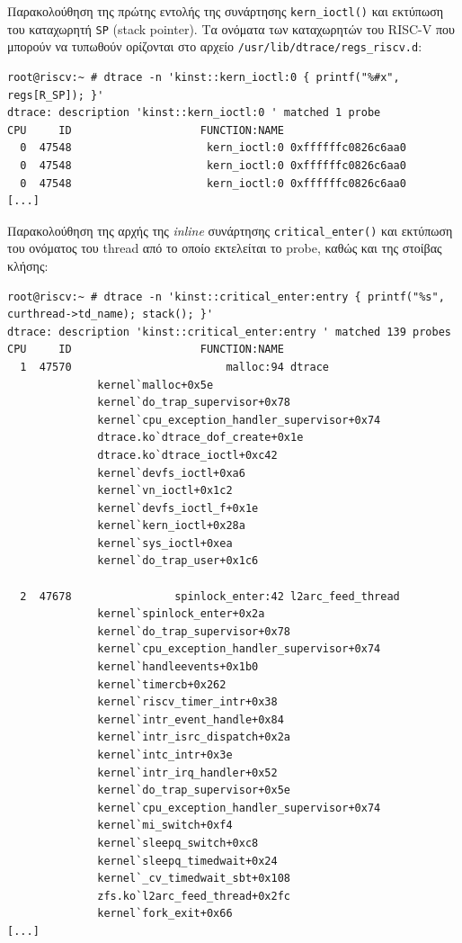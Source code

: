 \documentclass[12pt]{article}
\begin{document}
Παρακολούθηση της πρώτης εντολής της συνάρτησης \lstinline{kern_ioctl()} και
εκτύπωση του καταχωρητή \lstinline{SP} (stack pointer). Τα ονόματα των
καταχωρητών του RISC-V που μπορούν να τυπωθούν ορίζονται στο αρχείο
\lstinline{/usr/lib/dtrace/regs_riscv.d}:

\begin{lstlisting}
root@riscv:~ # dtrace -n 'kinst::kern_ioctl:0 { printf("%#x", regs[R_SP]); }'
dtrace: description 'kinst::kern_ioctl:0 ' matched 1 probe
CPU     ID                    FUNCTION:NAME
  0  47548                     kern_ioctl:0 0xffffffc0826c6aa0
  0  47548                     kern_ioctl:0 0xffffffc0826c6aa0
  0  47548                     kern_ioctl:0 0xffffffc0826c6aa0
[...]
\end{lstlisting}

Παρακολούθηση της αρχής της \textit{inline} συνάρτησης
\lstinline{critical_enter()} και εκτύπωση του ονόματος του thread από το οποίο
εκτελείται το probe, καθώς και της στοίβας κλήσης:

\begin{lstlisting}
root@riscv:~ # dtrace -n 'kinst::critical_enter:entry { printf("%s", curthread->td_name); stack(); }'
dtrace: description 'kinst::critical_enter:entry ' matched 139 probes
CPU     ID                    FUNCTION:NAME
  1  47570                        malloc:94 dtrace
              kernel`malloc+0x5e
              kernel`do_trap_supervisor+0x78
              kernel`cpu_exception_handler_supervisor+0x74
              dtrace.ko`dtrace_dof_create+0x1e
              dtrace.ko`dtrace_ioctl+0xc42
              kernel`devfs_ioctl+0xa6
              kernel`vn_ioctl+0x1c2
              kernel`devfs_ioctl_f+0x1e
              kernel`kern_ioctl+0x28a
              kernel`sys_ioctl+0xea
              kernel`do_trap_user+0x1c6

  2  47678                spinlock_enter:42 l2arc_feed_thread
              kernel`spinlock_enter+0x2a
              kernel`do_trap_supervisor+0x78
              kernel`cpu_exception_handler_supervisor+0x74
              kernel`handleevents+0x1b0
              kernel`timercb+0x262
              kernel`riscv_timer_intr+0x38
              kernel`intr_event_handle+0x84
              kernel`intr_isrc_dispatch+0x2a
              kernel`intc_intr+0x3e
              kernel`intr_irq_handler+0x52
              kernel`do_trap_supervisor+0x5e
              kernel`cpu_exception_handler_supervisor+0x74
              kernel`mi_switch+0xf4
              kernel`sleepq_switch+0xc8
              kernel`sleepq_timedwait+0x24
              kernel`_cv_timedwait_sbt+0x108
              zfs.ko`l2arc_feed_thread+0x2fc
              kernel`fork_exit+0x66
[...]
\end{lstlisting}
\end{document}
